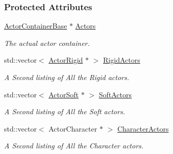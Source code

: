 \subsubsection*{Protected Attributes}
\begin{DoxyCompactItemize}
\item 
\hypertarget{classphys_1_1ActorManager_a7e6b7f66bdcf78475a2b07f8acac0418}{
\hyperlink{classphys_1_1ActorContainerBase}{ActorContainerBase} $\ast$ \hyperlink{classphys_1_1ActorManager_a7e6b7f66bdcf78475a2b07f8acac0418}{Actors}}
\label{classphys_1_1ActorManager_a7e6b7f66bdcf78475a2b07f8acac0418}

\begin{DoxyCompactList}\small\item\em The actual actor container. \item\end{DoxyCompactList}\item 
\hypertarget{classphys_1_1ActorManager_aeef3741b00d08ab6a51ba2962429ba4d}{
std::vector$<$ \hyperlink{classphys_1_1ActorRigid}{ActorRigid} $\ast$ $>$ \hyperlink{classphys_1_1ActorManager_aeef3741b00d08ab6a51ba2962429ba4d}{RigidActors}}
\label{classphys_1_1ActorManager_aeef3741b00d08ab6a51ba2962429ba4d}

\begin{DoxyCompactList}\small\item\em A Second listing of All the Rigid actors. \item\end{DoxyCompactList}\item 
\hypertarget{classphys_1_1ActorManager_a36ceb34508b78c5c13cba1dfc833b0f4}{
std::vector$<$ \hyperlink{classphys_1_1ActorSoft}{ActorSoft} $\ast$ $>$ \hyperlink{classphys_1_1ActorManager_a36ceb34508b78c5c13cba1dfc833b0f4}{SoftActors}}
\label{classphys_1_1ActorManager_a36ceb34508b78c5c13cba1dfc833b0f4}

\begin{DoxyCompactList}\small\item\em A Second listing of All the Soft actors. \item\end{DoxyCompactList}\item 
\hypertarget{classphys_1_1ActorManager_a3c2d7fb69bc1573182dd13c598a56c4f}{
std::vector$<$ ActorCharacter $\ast$ $>$ \hyperlink{classphys_1_1ActorManager_a3c2d7fb69bc1573182dd13c598a56c4f}{CharacterActors}}
\label{classphys_1_1ActorManager_a3c2d7fb69bc1573182dd13c598a56c4f}

\begin{DoxyCompactList}\small\item\em A Second listing of All the Character actors. \item\end{DoxyCompactList}\end{DoxyCompactItemize}


